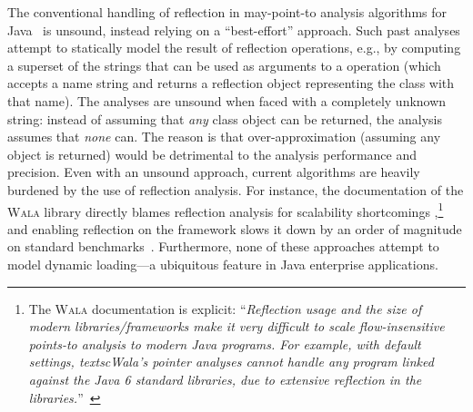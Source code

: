 The conventional handling of reflection in may-point-to analysis algorithms for Java~\cite{www:wala-reflection,ecoop:2014:Li,aplas:2005:Livshits,thesis:Livshits,aplas:2015:Smaragdakis,sas:2015:Li} is unsound, instead relying on a ``best-effort'' approach.  Such past analyses attempt to statically model the result of reflection operations, e.g., by computing a superset of the strings that can be used as arguments to a  operation (which accepts a name string and returns a reflection object representing the class with that name). The analyses are unsound when faced with a completely unknown string: instead of assuming that \emph{any} class object can be returned, the analysis assumes that \emph{none} can. The reason is that over-approximation (assuming any object is returned) would be detrimental to the analysis performance and precision. Even with an unsound approach, current algorithms are heavily burdened by the use of reflection analysis. For instance, the documentation of the \textsc{Wala} library directly blames reflection analysis for scalability shortcomings \cite{www:wala-reflection},\footnote{The \textsc{Wala} documentation is explicit: ``\emph{Reflection usage and the size of modern libraries/frameworks make it very difficult to scale flow-insensitive points-to analysis to modern Java programs. For example, with default settings, textsc{Wala}'s pointer analyses cannot handle any program linked against the Java 6 standard libraries, due to extensive reflection in the libraries.}''~\cite{www:wala-reflection}} and enabling reflection on the \doop{} framework slows it down by an order of magnitude on standard benchmarks~\cite{aplas:2015:Smaragdakis}. Furthermore, none of these approaches attempt to model dynamic loading---a ubiquitous feature in Java enterprise applications.